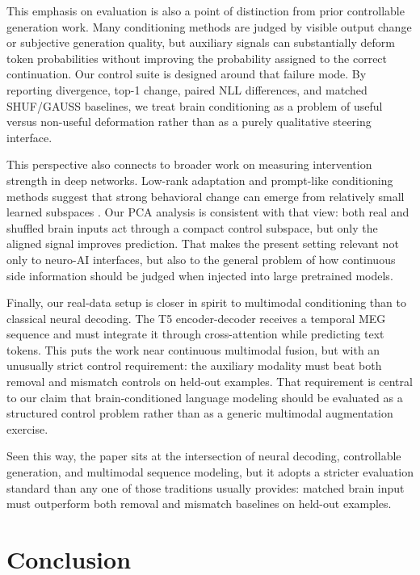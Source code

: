 \documentclass{article}
\theoremstyle{plain}
\theoremstyle{definition}
\theoremstyle{remark}
\begin{document}
This emphasis on evaluation is also a point of distinction from prior controllable generation work.
Many conditioning methods are judged by visible output change or subjective generation quality, but auxiliary signals can substantially deform token probabilities without improving the probability assigned to the correct continuation.
Our control suite is designed around that failure mode.
By reporting divergence, top-1 change, paired NLL differences, and matched SHUF/GAUSS baselines, we treat brain conditioning as a problem of useful versus non-useful deformation rather than as a purely qualitative steering interface.

This perspective also connects to broader work on measuring intervention strength in deep networks.
Low-rank adaptation and prompt-like conditioning methods suggest that strong behavioral change can emerge from relatively small learned subspaces \citep{hu2021lora,li2021prefixtuning,lester2021prompttuning}.
Our PCA analysis is consistent with that view: both real and shuffled brain inputs act through a compact control subspace, but only the aligned signal improves prediction.
That makes the present setting relevant not only to neuro-AI interfaces, but also to the general problem of how continuous side information should be judged when injected into large pretrained models.

Finally, our real-data setup is closer in spirit to multimodal conditioning than to classical neural decoding.
The T5 encoder-decoder receives a temporal MEG sequence and must integrate it through cross-attention while predicting text tokens.
This puts the work near continuous multimodal fusion, but with an unusually strict control requirement: the auxiliary modality must beat both removal and mismatch controls on held-out examples.
That requirement is central to our claim that brain-conditioned language modeling should be evaluated as a structured control problem rather than as a generic multimodal augmentation exercise.

Seen this way, the paper sits at the intersection of neural decoding, controllable generation, and multimodal sequence modeling, but it adopts a stricter evaluation standard than any one of those traditions usually provides: matched brain input must outperform both removal and mismatch baselines on held-out examples.




\section{Conclusion}
\end{document}
